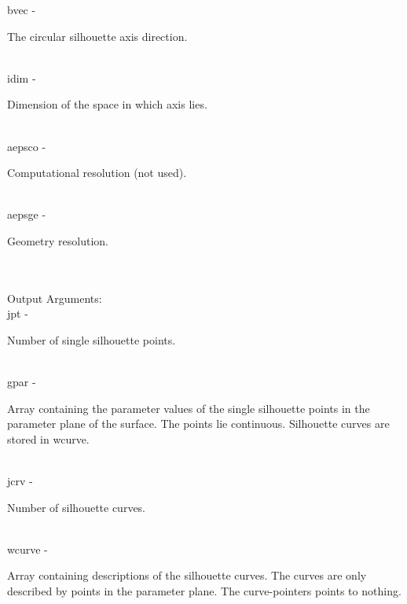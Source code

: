         \>\>    {\fov bvec}\> - \>  \begin{minipg2}
                        The circular silhouette axis direction.
                               \end{minipg2}\\
        \>\>    {\fov idim}\> - \>  \begin{minipg2}
                       Dimension of the space in which axis lies.
                               \end{minipg2}\\
        \>\>    {\fov aepsco}\> - \>  \begin{minipg2}
                       Computational resolution (not used).
                               \end{minipg2}\\
        \>\>    {\fov aepsge}\> - \>  \begin{minipg2}
                       Geometry resolution.
                               \end{minipg2}\\
\\
        \>Output Arguments:\\
        \>\>    {\fov jpt}\> - \>  \begin{minipg2}
                     Number of single silhouette points.
                               \end{minipg2}\\
        \>\>    {\fov gpar}\> - \>  \begin{minipg2}
                     Array containing the parameter values of the
                       single silhouette points in the parameter
                       plane of the surface. The points lie continuous.
                       Silhouette curves are stored in wcurve.
                               \end{minipg2}\\[0.8ex]
        \>\>    {\fov jcrv}\> - \>  \begin{minipg2}
                     Number of silhouette curves.
                               \end{minipg2}\\
        \>\>    {\fov wcurve}\> - \>  \begin{minipg2}
                     Array containing descriptions of the silhouette
                     curves. The curves are only described by points
                     in the parameter plane. The curve-pointers points
                     to nothing.
                               \end{minipg2}\\[0.8ex]
